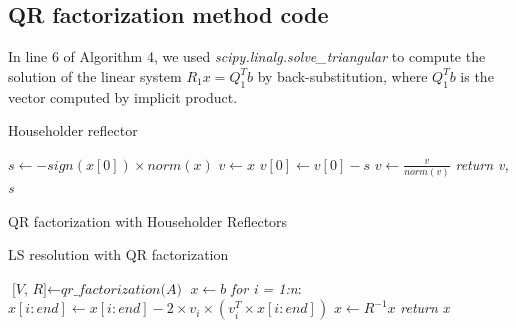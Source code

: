 \documentclass{article}
\begin{document}
\subsection{QR factorization method code}\label{subsec:qr-code}
In line 6 of Algorithm 4, we used \textit{scipy.linalg.solve\_triangular} to compute the solution of the linear system $R_{1}x = Q_{1}^{T}b$ by back-substitution, where $Q_{1}^{T}b$ is the vector computed by implicit product.
\makeatletter
\def\BState{\State\hskip-\ALG@thistlm}
\makeatother
\begin{algorithm}
\caption{Householder reflector}
\begin{algorithmic}[1]
\State $s \gets -sign(x[0]) \times norm(x)$
\State $v \gets x$
\State $v[0] \gets v[0] -s$
\State $v \gets \frac{v}{norm(v)}$
\State \textit{return v, s}
\EndFunction
\end{algorithmic}
\end{algorithm}
\makeatletter
\makeatother
\begin{algorithm}
\caption{QR factorization with Householder Reflectors}
\end{algorithm}
\makeatletter
\makeatother
\begin{algorithm}
\caption{LS resolution with QR factorization}
\begin{algorithmic}[1]
\State $\textit{[V, R]} \gets \textit{qr\_factorization(A)}$
\State $x \gets b$
\State \emph{for i = 1:n}:
\State \quad$x[i:end] \gets x[i:end] - 2 \times v_{i} \times (v_{i}^{T} \times x[i:end])$
\State $x \gets R^{-1}x$
\State \textit{return x}
\EndFunction
\end{algorithmic}
\end{algorithm}
\end{document}
